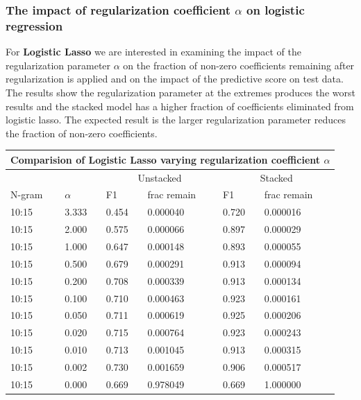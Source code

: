 \documentclass[11pt]{article}
\begin{document}
{\subsubsection{The impact of regularization coefficient $\alpha$ on logistic regression}
\noindent 
For \textbf{Logistic Lasso} we are interested in examining the impact of the regularization parameter $\alpha$ on
the fraction of  non-zero coefficients remaining after regularization is applied and on the impact of the predictive
score on test data. The results show the regularization parameter at the extremes produces the worst results
and the stacked model has a higher fraction of coefficients eliminated from logistic lasso. The expected result
is the larger regularization parameter reduces the fraction of non-zero coefficients.\\

\noindent \begin{tabular}{ |p{2cm}||p{2cm}|p{2cm}|p{2cm}|p{2cm}|p{2cm}|  }
 \hline
 \multicolumn{6}{|c|}{Comparision of Logistic Lasso varying regularization coefficient $\alpha$} \\
 \hline
 \multicolumn{1}{|c|}{} &
 \multicolumn{1}{|c|}{} &
 \multicolumn{2}{|c|}{Unstacked} &
 \multicolumn{2}{|c|}{Stacked}\\
 \hline
 N-gram & $\alpha$ & F1 & frac remain & F1 & frac remain\\
 \hline

10:15 &  3.333 & 0.454 & 0.000040 & 0.720 & 0.000016 \\
10:15 &  2.000 & 0.575 & 0.000066 & 0.897 & 0.000029 \\
10:15 &  1.000 & 0.647 & 0.000148 & 0.893 & 0.000055 \\
10:15 &  0.500 & 0.679 & 0.000291 & 0.913 & 0.000094 \\
10:15 &  0.200 & 0.708 & 0.000339 & 0.913 & 0.000134 \\
10:15 &  0.100 & 0.710 & 0.000463 & 0.923 & 0.000161 \\
10:15 &  0.050 & 0.711 & 0.000619 & 0.925 & 0.000206 \\
10:15 &  0.020 & 0.715 & 0.000764 & 0.923 & 0.000243 \\
10:15 &  0.010 & 0.713 & 0.001045 & 0.913 & 0.000315 \\
10:15 &  0.002 & 0.730 & 0.001659 & 0.906 & 0.000517 \\
10:15 &  0.000 & 0.669 & 0.978049 & 0.669 & 1.000000 \\
 \hline
\end{tabular}

}
\end{document}
